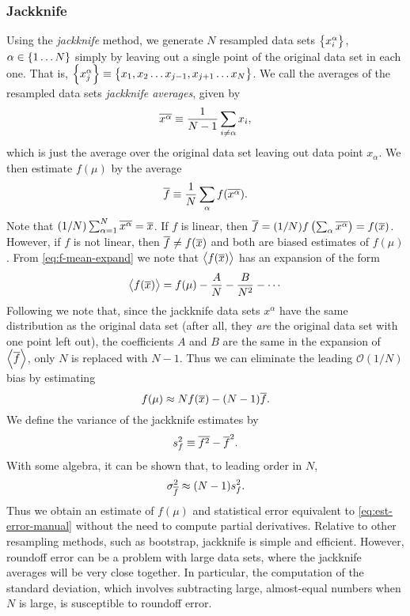 \subsubsection{Jackknife}

Using the \emph{jackknife} method, we generate $N$ resampled data sets
$\cbr{x_i^{\alpha}}$, $\alpha \in \cbr{1 \dots N}$ simply by leaving out a
single point of the original data set in each one.
That is,
$\cbr{x_j^{\alpha}} \equiv \cbr{x_1,x_2 \dots x_{j-1},x_{j+1} \dots x_N}$.
We call the averages of the
resampled data sets \emph{jackknife averages}, given by
\begin{equation}
  \overline{x^{\alpha}} \equiv \frac{1}{N-1} \sum_{i \neq \alpha} x_i,
\end{equation}
which is just the average over the original data set leaving out data point
$x_{\alpha}$. We then estimate $f(\mu)$ by the average
\begin{equation}
  \overline{f} \equiv \frac{1}{N} \sum_{\alpha} f(\overline{x^{\alpha}}).
  \label{eq:f-est-jk}
\end{equation}
Note that $(1/N) \sum_{\alpha=1}^N \overline{x^{\alpha}} = \overline{x}$.
If $f$ is linear, then
$\overline{f}=(1/N)f\left(\sum_{\alpha} \overline{x^{\alpha}}\right)=f(\overline{x})$.
However, if $f$ is not linear, then $\overline{f} \neq f(\overline{x})$ and
both are biased estimates of $f(\mu)$. From \cref{eq:f-mean-expand}
we note that $\left< f(\overline{x}) \right>$ has an expansion of the form
\begin{equation}
  \left< f(\overline{x}) \right> = f(\mu) - \frac{A}{N} - \frac{B}{N^2} - \cdots
\end{equation}
Following \textcite{young2015everything} we note that, since the jackknife
data sets $x^{\alpha}$ have the same distribution as the original data set
(after all, they \emph{are} the original data set with one point left out),
the coefficients $A$ and $B$ are the same in the expansion of
$\left< \overline{f} \right>$, only $N$ is replaced with $N-1$. Thus we can eliminate the
leading $\mathcal{O}(1/N)$ bias by estimating
\begin{equation}
  f(\mu) \approx N f(\overline{x}) - (N-1) \overline{f}.
\end{equation}
We define the variance of the jackknife estimates by
\begin{equation}
  s_f^2 \equiv \overline{f^2} - \overline{f}^2.
  \label{eq:f-var-jk}
\end{equation}
With some algebra, it can be shown that, to leading order in $N$,
\begin{equation}
  \sigma_{\overline{f}}^2 \approx (N-1) s_f^2.
  \label{eq:f-err-jk}
\end{equation}
Thus we obtain an estimate of $f(\mu)$ and statistical error equivalent to
\cref{eq:est-error-manual} without the need to compute partial derivatives.
Relative to other resampling methods, such as bootstrap, jackknife is simple
and efficient. However, roundoff error can be a problem with large data sets,
where the jackknife averages will be very close together. In particular, the
computation of the standard deviation, which involves subtracting large,
almost-equal numbers when $N$ is large, is susceptible to roundoff error.

